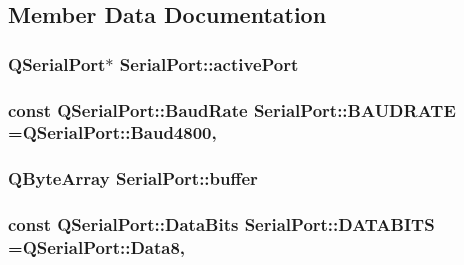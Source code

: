 \subsection{Member Data Documentation}
\hypertarget{class_serial_port_abf454cb55d0053b354080a0dd6a43800}{
\subsubsection[{active\-Port}]{\setlength{\rightskip}{0pt plus 5cm}Q\-Serial\-Port$\ast$ Serial\-Port\-::active\-Port\hspace{0.3cm}{\ttfamily [private]}}}\label{class_serial_port_abf454cb55d0053b354080a0dd6a43800}
\hypertarget{class_serial_port_af5e3812b185f5f72c3ac1c298497694b}{
\subsubsection[{B\-A\-U\-D\-R\-A\-T\-E}]{\setlength{\rightskip}{0pt plus 5cm}const Q\-Serial\-Port\-::\-Baud\-Rate Serial\-Port\-::\-B\-A\-U\-D\-R\-A\-T\-E =Q\-Serial\-Port\-::\-Baud4800\hspace{0.3cm}{\ttfamily [static]}, {\ttfamily [private]}}}\label{class_serial_port_af5e3812b185f5f72c3ac1c298497694b}
\hypertarget{class_serial_port_af5ff5c504f070840bd28ee371f353f05}{
\subsubsection[{buffer}]{\setlength{\rightskip}{0pt plus 5cm}Q\-Byte\-Array Serial\-Port\-::buffer\hspace{0.3cm}{\ttfamily [private]}}}\label{class_serial_port_af5ff5c504f070840bd28ee371f353f05}
\hypertarget{class_serial_port_a74455f210ee1c4704daf3347b7d2b088}{
\subsubsection[{D\-A\-T\-A\-B\-I\-T\-S}]{\setlength{\rightskip}{0pt plus 5cm}const Q\-Serial\-Port\-::\-Data\-Bits Serial\-Port\-::\-D\-A\-T\-A\-B\-I\-T\-S =Q\-Serial\-Port\-::\-Data8\hspace{0.3cm}{\ttfamily [static]}, {\ttfamily [private]}}}\label{class_serial_port_a74455f210ee1c4704daf3347b7d2b088}
